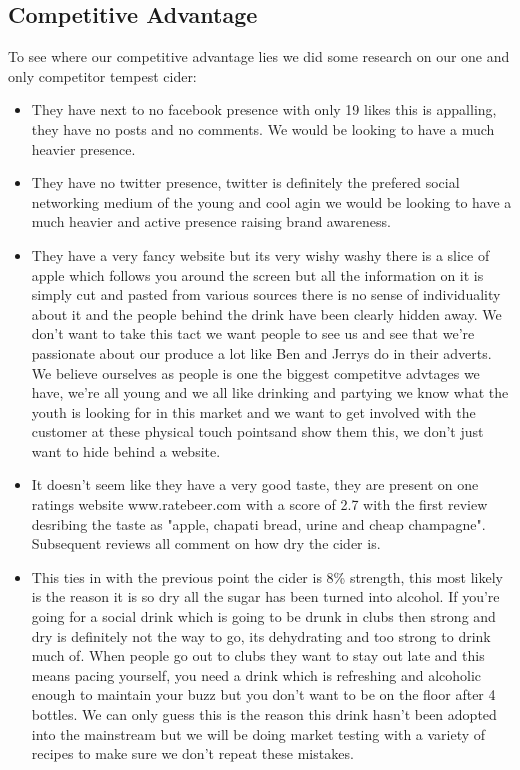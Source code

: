 \documentclass[11pt]{article}
\begin{document}
  \subsection{Competitive Advantage}
To see where our competitive advantage lies we did some research on our one and
only competitor tempest cider:

\begin{itemize}
	\item They have next to no facebook presence with only 19 likes this is
appalling, they have no posts and no comments. We would be looking to have a
much heavier presence.
	\item They have no twitter presence, twitter is definitely the prefered social
networking medium of the young and cool agin we would be looking to have a much
heavier and active presence raising brand awareness.
	\item They have a very fancy website but its very wishy washy there is a slice
of apple which follows you around the screen but all the information on it is
simply cut and pasted from various sources there is no sense of individuality
about it and the people behind the drink have been clearly hidden away. We don't
want to take this tact we want people to see us and see that we're passionate
about our produce a lot like Ben and Jerrys do in their adverts. We believe
ourselves as people is one the biggest competitve advtages we have, we're all
young and we all like drinking and partying we know what the youth is looking
for in this market and we want to get involved with the customer at these
physical touch pointsand show them this, we don't just want to hide behind a
website.
	\item It doesn't seem like they have a very good taste, they are present on
one ratings website www.ratebeer.com with a score of 2.7 with the first review
desribing the taste as "apple, chapati bread, urine and cheap champagne".
Subsequent reviews all comment on how dry the cider is.
	\item This ties in with the previous point the cider is 8\% strength, this
most likely is the reason it is so dry all the sugar has been turned into
alcohol. If you're going for a social drink which is going to be drunk in clubs
then strong and dry is definitely not the way to go, its dehydrating and too
strong to drink much of. When people go out to clubs they want to stay out late
and this means pacing yourself, you need a drink which is refreshing and
alcoholic enough to maintain your buzz but you don't want to be on the floor
after 4 bottles. We can only guess this is the reason this drink hasn't been
adopted into the mainstream but we will be doing market testing with a variety
of recipes to make sure we don't repeat these mistakes.
\end{itemize}
\newpage
\end{document}
